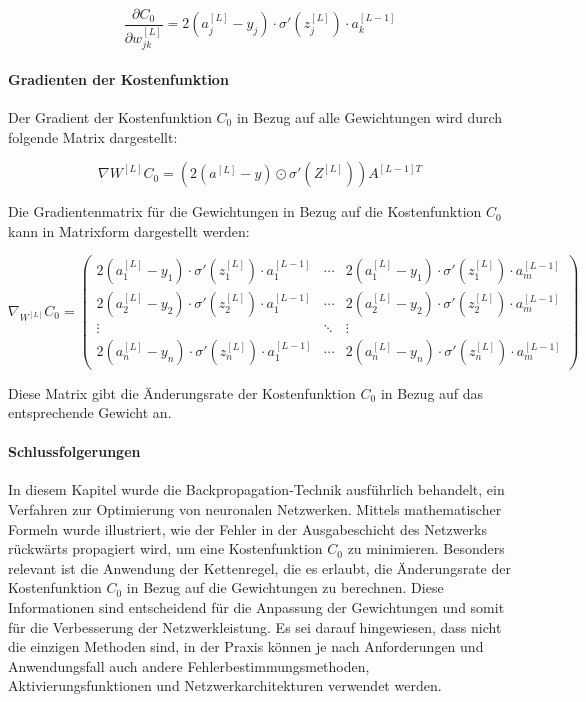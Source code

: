 \[
\frac{\partial C_0}{\partial w_{jk}^{[L]}} = 2 \left( a_j^{[L]} - y_j \right) \cdot \sigma' \left( z_j^{[L]} \right) \cdot a_k^{[L-1]}
\]

\paragraph{Gradienten der Kostenfunktion}

Der Gradient der Kostenfunktion \( C_0 \) in Bezug auf alle Gewichtungen wird durch folgende Matrix dargestellt:

\[
\nabla W^{[L]} C_0 = \left( 2 \left( a^{[L]} - y \right) \odot \sigma' \left( Z^{[L]} \right) \right) A^{[L-1]T}
\label{eq: gradient}
\]

Die Gradientenmatrix für die Gewichtungen in Bezug auf die Kostenfunktion \( C_0 \) kann in Matrixform dargestellt werden:

\[
\nabla_{W^{[L]}} C_0 = 
\begin{pmatrix}
2(a_1^{[L]} - y_1) \cdot \sigma' (z_1^{[L]}) \cdot a_1^{[L-1]} & \cdots & 2(a_1^{[L]} - y_1) \cdot \sigma' (z_1^{[L]}) \cdot a_m^{[L-1]} \\
2(a_2^{[L]} - y_2) \cdot \sigma' (z_2^{[L]}) \cdot a_1^{[L-1]} & \cdots & 2(a_2^{[L]} - y_2) \cdot \sigma' (z_2^{[L]}) \cdot a_m^{[L-1]} \\
\vdots & \ddots & \vdots \\
2(a_n^{[L]} - y_n) \cdot \sigma' (z_n^{[L]}) \cdot a_1^{[L-1]} & \cdots & 2(a_n^{[L]} - y_n) \cdot \sigma' (z_n^{[L]}) \cdot a_m^{[L-1]}

\label{eq: gradient matrix}
\end{pmatrix}
\]

Diese Matrix gibt die Änderungsrate der Kostenfunktion \( C_0 \) in Bezug auf das entsprechende Gewicht an.
\cite{SuttonBarto2018}

\paragraph{Schlussfolgerungen}
In diesem Kapitel wurde die Backpropagation-Technik ausführlich behandelt, ein Verfahren zur Optimierung von neuronalen Netzwerken. Mittels mathematischer Formeln wurde illustriert, wie der Fehler in der Ausgabeschicht des Netzwerks rückwärts propagiert wird, um eine Kostenfunktion \( C_0 \) zu minimieren. Besonders relevant ist die Anwendung der Kettenregel, die es erlaubt, die Änderungsrate der Kostenfunktion \( C_0 \) in Bezug auf die Gewichtungen zu berechnen. Diese Informationen sind entscheidend für die Anpassung der Gewichtungen und somit für die Verbesserung der Netzwerkleistung. Es sei darauf hingewiesen, dass nicht die einzigen Methoden sind, in der Praxis können je nach Anforderungen und Anwendungsfall auch andere Fehlerbestimmungsmethoden, Aktivierungsfunktionen und Netzwerkarchitekturen verwendet werden.

